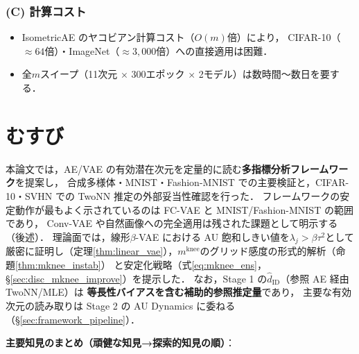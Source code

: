 \documentclass[11pt,a4paper]{jsarticle}
\newcommand{\mknee}{m^{\mathrm{knee}}}
\begin{document}
\subsubsection*{(C) 計算コスト}

\begin{itemize}
  \item IsometricAE のヤコビアン計算コスト（$O(m)$倍）により，
        CIFAR-10（$\approx 64$倍）・ImageNet（$\approx 3{,}000$倍）への直接適用は困難．
  \item 全$m$スイープ（11次元 $\times$ 300エポック $\times$ 2モデル）は数時間〜数日を要する．
\end{itemize}

\section{むすび}\label{sec:conclusion}

本論文では，AE/VAE の有効潜在次元を定量的に読む\textbf{多指標分析フレームワーク}を提案し，
合成多様体・MNIST・Fashion-MNIST での主要検証と，CIFAR-10・SVHN での TwoNN 推定の外部妥当性確認を行った．
フレームワークの安定動作が最もよく示されているのは FC-VAE と MNIST/Fashion-MNIST の範囲であり，
Conv-VAE や自然画像への完全適用は残された課題として明示する（後述）．
理論面では，線形$\beta$-VAE における AU 飽和しきい値を$\lambda_j > \beta\tau^2$として
厳密に証明し（定理\ref{thm:linear_vae}），$\mknee$のグリッド感度の形式的解析（命題\ref{thm:mknee_instab}）
と安定化戦略（式\eqref{eq:mknee_ens}，§\ref{sec:disc_mknee_improve}）を提示した．
なお，Stage 1 の$\hat{d}_\mathrm{ID}$（参照 AE 経由 TwoNN/MLE）は
\textbf{等長性バイアスを含む補助的参照推定量}であり，
主要な有効次元の読み取りは Stage 2 の AU Dynamics に委ねる（§\ref{sec:framework_pipeline}）．

\textbf{主要知見のまとめ（頑健な知見→探索的知見の順）}：
\end{document}
